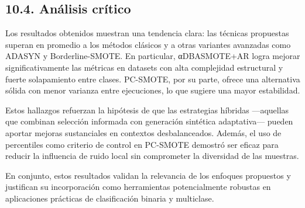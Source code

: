 \subsection{10.4. Análisis crítico}

Los resultados obtenidos muestran una tendencia clara: las técnicas propuestas superan en promedio a los métodos clásicos y a otras variantes avanzadas como ADASYN y Borderline-SMOTE. En particular, αDBASMOTE+AR logra mejorar significativamente las métricas en datasets con alta complejidad estructural y fuerte solapamiento entre clases. PC-SMOTE, por su parte, ofrece una alternativa sólida con menor varianza entre ejecuciones, lo que sugiere una mayor estabilidad.

Estos hallazgos refuerzan la hipótesis de que las estrategias híbridas —aquellas que combinan selección informada con generación sintética adaptativa— pueden aportar mejoras sustanciales en contextos desbalanceados. Además, el uso de percentiles como criterio de control en PC-SMOTE demostró ser eficaz para reducir la influencia de ruido local sin comprometer la diversidad de las muestras.

En conjunto, estos resultados validan la relevancia de los enfoques propuestos y justifican su incorporación como herramientas potencialmente robustas en aplicaciones prácticas de clasificación binaria y multiclase.
